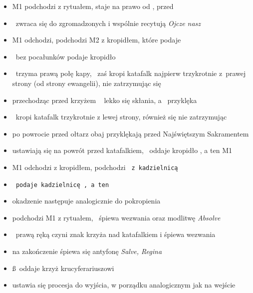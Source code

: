 \begin{itemize}
	\item M1 podchodzi z rytuałem, staje na prawo od \ii, przed \dd
	\item \ii~zwraca się do zgromadzonych i wspólnie recytują \textit{Ojcze
		nasz}
	\item M1 odchodzi, podchodzi M2 z kropidłem, które podaje \dd
	\item \dd~bez pocałunków podaje kropidło \ii
	\item \dd~trzyma prawą połę kapy, \ii~zaś kropi katafalk najpierw
		trzykrotnie z prawej strony (od strony ewangelii), nie
		zatrzymując się
	\item przechodząc przed krzyżem \ii~ lekko się skłania, a \dd~przyklęka
	\item \ii~kropi katafalk trzykrotnie z lewej strony, również się nie
		zatrzymując
	\item po powrocie przed ołtarz obaj przyklękają przed Najświętszym
		Sakramentem
	\item ustawiają się na powrót przed katafalkiem, \ii~oddaje kropidło \dd, a
		ten M1
	\item M1 odchodzi z kropidłem, podchodzi \tt~z kadzielnicą
	\item \tt~podaje kadzielnicę \dd, a ten \ii
	\item okadzenie następuje analogicznie do pokropienia
	\item podchodzi M1 z rytuałem, \ii~śpiewa wezwania oraz modlitwę
		\textit{Absolve}
	\item \ii~prawą ręką czyni znak krzyża nad katafalkiem i śpiewa wezwania
	\item na zakończenie śpiewa się antyfonę \textit{Salve, Regina}
	\item \ss~oddaje krzyż krucyferariuszowi
	\item ustawia się procesja do wyjścia, w porządku analogicznym jak na
		wejście
\end{itemize}

